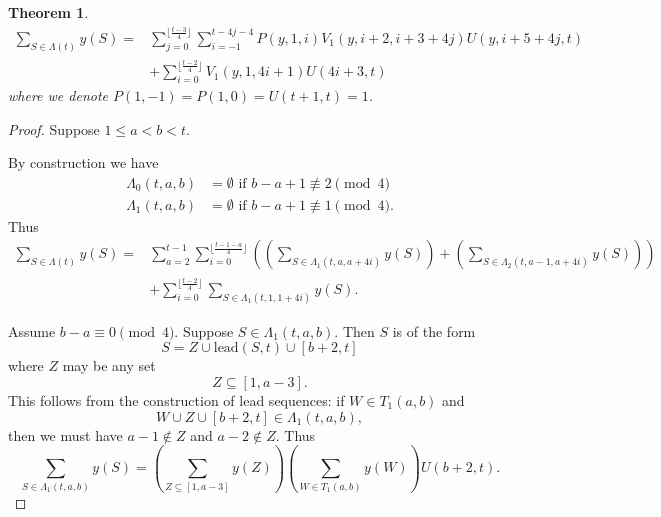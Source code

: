 \documentclass[10pt,a4paper]{amsart}
\newtheorem{theorem}{Theorem}
\begin{document}
\begin{theorem} \label{t 1 2 sum}
\begin{align}
\sum_{S \in \Lambda(t)} y(S)=& \sum_{j=0}^{\lfloor \frac{t-3}{4}\rfloor}\sum_{i =-1}^{t-4j-4}P(y,1,i) V_1(y,i+2,i+3+4j) U(y,i+5+4j,t) \label{l 2 sum}\\
& + \sum_{i=0}^{\lfloor \frac{t-2}{4}\rfloor} V_1(y,1,4i+1) U(4i+3, t) \label{l 1 sum}
\end{align}
where we denote $P(1,-1) = P(1,0) = U(t+1,t) = 1$. 
\end{theorem}

\begin{proof} 


Suppose $1 \leq a < b <t$. 

By construction we have
\begin{align*}
\Lambda_0(t,a,b) &= \emptyset \text{ if } b-a+1 \not\equiv 2 \pmod 4 \\ 
 \Lambda_1(t,a,b) &= \emptyset \text{ if } b-a+1 \not\equiv 1 \pmod 4. 
\end{align*}
Thus 
\begin{align}
\sum_{S \in \Lambda(t)} y(S) =& \sum_{a=2}^{t-1} \sum_{i=0}^{\lfloor \frac{t-1-a}{4} \rfloor}((\sum_{S \in \Lambda_1(t,a,a+4i)} y(S))+ (\sum_{S \in \Lambda_2(t,a-1,a+4i)} y(S)))\label{2 sum}\\ 
&+ \sum_{i=0}^{\lfloor \frac{t-2}{4} \rfloor}\sum_{S \in \Lambda_1(t,1,1+4i)} y(S). \label{1 sum}
\end{align}

Assume $b-a \equiv 0 \pmod 4$. Suppose $S \in \Lambda_1(t,a,b)$. Then $S$ is of the form 
\[
S = Z \cup \mathrm{lead}(S,t) \cup [b+2,t]
\]
where $Z$ may be any set 
\[
Z \subseteq [1,a-3].
\]
This follows from the construction of lead sequences: if $W \in T_1(a,b)$ and \[W\cup Z \cup [b+2,t] \in \Lambda_1(t,a,b),\] then we must have $a-1 \notin Z$ and $a-2 \notin Z$. 
Thus
\begin{equation} \label{SZ1}
\sum_{S \in \Lambda_1(t,a,b)} y(S) = \left(\sum_{Z \subseteq [1,a-3]} y(Z) \right )\left (\sum_{W \in T_1(a,b)} y(W) \right ) U(b+2, t) .
\end{equation}


\end{proof}
\end{document}
